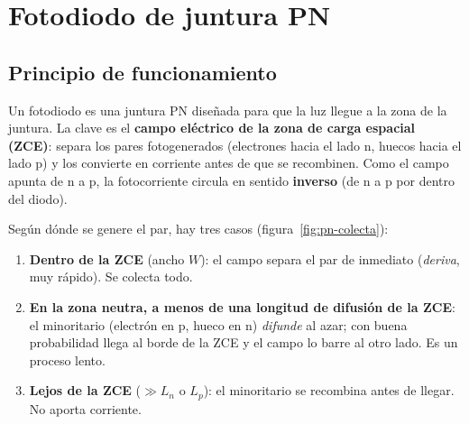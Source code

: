 \section{Fotodiodo de juntura PN}
\label{sec:pn}

\subsection{Principio de funcionamiento}

Un fotodiodo es una juntura PN diseñada para que la luz llegue a la zona de la juntura.
La clave es el \textbf{campo eléctrico de la zona de carga espacial (ZCE)}: separa los
pares fotogenerados (electrones hacia el lado n, huecos hacia el lado p) y los convierte
en corriente antes de que se recombinen. Como el campo apunta de n a p, la fotocorriente
circula en sentido \textbf{inverso} (de n a p por dentro del diodo).

Según dónde se genere el par, hay tres casos (figura~\ref{fig:pn-colecta}):
\begin{enumerate}
  \item \textbf{Dentro de la ZCE} (ancho $W$): el campo separa el par de inmediato
  (\emph{deriva}, muy rápido). Se colecta todo.
  \item \textbf{En la zona neutra, a menos de una longitud de difusión de la ZCE}: el
  minoritario (electrón en p, hueco en n) \emph{difunde} al azar; con buena probabilidad
  llega al borde de la ZCE y el campo lo barre al otro lado. Es un proceso lento.
  \item \textbf{Lejos de la ZCE} ($\gg L_n$ o $L_p$): el minoritario se recombina antes de
  llegar. No aporta corriente.
\end{enumerate}

